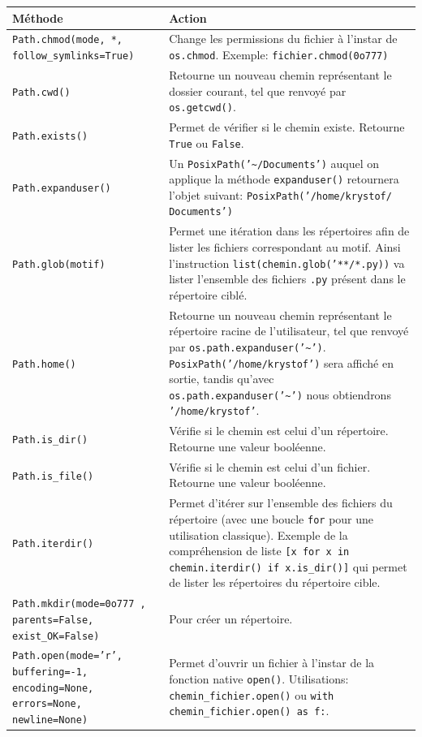 \documentclass[a4paper,11pt]{book}
\begin{document}
\begin{table}[h]\label{pathlib_1}
\begin{center}
\begin{tabular}{|p{4cm}|p{10.5cm}|}
\hline
\textbf{Méthode} & \textbf{Action} \\
\hline
\texttt{Path.chmod(mode, *, follow\_symlinks=True)} & Change les permissions du fichier à l'instar de \texttt{os.chmod}. Exemple: \texttt{fichier.chmod(0o777)} \\
\hline
\texttt{Path.cwd()} & Retourne un nouveau chemin représentant le dossier courant, tel que renvoyé par \texttt{os.getcwd()}. \\
\hline
\texttt{Path.exists()} & Permet de vérifier si le chemin existe. Retourne \texttt{True} ou \texttt{False}. \\
\hline
\texttt{Path.expanduser()} & Un \texttt{PosixPath('\~{}/Documents')} auquel on applique la méthode \texttt{expanduser()} retournera l'objet suivant: \texttt{PosixPath('/home/krystof/ Documents')} \\
\hline
\texttt{Path.glob(motif)} & Permet une itération dans les répertoires afin de lister les fichiers correspondant au motif. Ainsi l'instruction \texttt{list(chemin.glob('**/*.py))} va lister l'ensemble des fichiers \texttt{.py} présent dans le répertoire ciblé. \\
\hline
\texttt{Path.home()} & Retourne un nouveau chemin représentant le répertoire racine de l'utilisateur, tel que renvoyé par \texttt{os.path.expanduser('\~{}')}. \texttt{PosixPath('/home/krystof')} sera affiché en sortie, tandis qu'avec \texttt{os.path.expanduser('\~{}')} nous obtiendrons \texttt{'/home/krystof'}. \\
\hline
\texttt{Path.is\_dir()} & Vérifie si le chemin est celui d'un répertoire. Retourne une valeur booléenne. \\
\hline
\texttt{Path.is\_file()} & Vérifie si le chemin est celui d'un fichier. Retourne une valeur booléenne. \\
\hline
\texttt{Path.iterdir()} & Permet d'itérer sur l'ensemble des fichiers du répertoire (avec une boucle \texttt{for} pour une utilisation classique). Exemple de la compréhension de liste \texttt{[x for x in chemin.iterdir() if x.is\_dir()]} qui permet de lister les répertoires du répertoire cible. \\
\hline
\texttt{Path.mkdir(mode=0o777 , parents=False, exist\_OK=False)} & Pour créer un répertoire. \\
\hline
\texttt{Path.open(mode='r', buffering=-1, encoding=None, errors=None, newline=None)} & Permet d'ouvrir un fichier à l'instar de la fonction native \texttt{open()}. Utilisations: \texttt{chemin\_fichier.open()} ou \texttt{with chemin\_fichier.open() as f:}. \\

\end{tabular}
\end{center}
\end{table}
\end{document}
